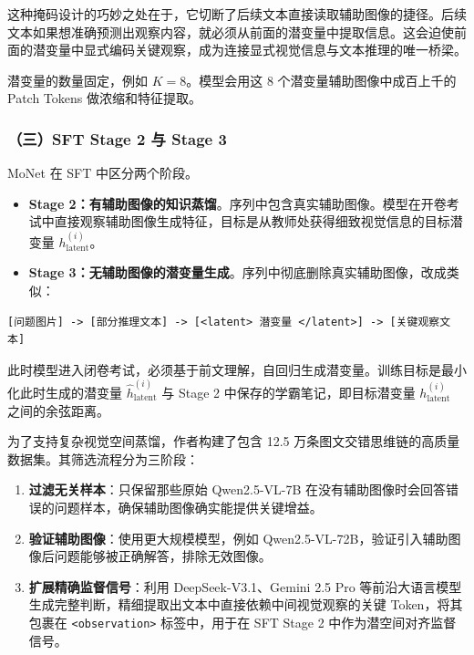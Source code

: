 这种掩码设计的巧妙之处在于，它切断了后续文本直接读取辅助图像的捷径。后续文本如果想准确预测出观察内容，就必须从前面的潜变量中提取信息。这会迫使前面的潜变量中显式编码关键观察，成为连接显式视觉信息与文本推理的唯一桥梁。

潜变量的数量固定，例如 \(K=8\)。模型会用这 8 个潜变量辅助图像中成百上千的 Patch Tokens 做浓缩和特征提取。

\hypertarget{ux4e09sft-stage-2-ux4e0e-stage-3}{%
\subsubsection{（三）SFT Stage 2 与 Stage 3}\label{ux4e09sft-stage-2-ux4e0e-stage-3}}

MoNet 在 SFT 中区分两个阶段。

\begin{itemize}
\tightlist
\item
  \textbf{Stage 2：有辅助图像的知识蒸馏}。序列中包含真实辅助图像。模型在开卷考试中直接观察辅助图像生成特征，目标是从教师处获得细致视觉信息的目标潜变量 \(h_{\text{latent}}^{(i)}\)。
\item
  \textbf{Stage 3：无辅助图像的潜变量生成}。序列中彻底删除真实辅助图像，改成类似：
\end{itemize}

\begin{verbatim}
[问题图片] -> [部分推理文本] -> [<latent> 潜变量 </latent>] -> [关键观察文本]
\end{verbatim}

此时模型进入闭卷考试，必须基于前文理解，自回归生成潜变量。训练目标是最小化此时生成的潜变量 \(\hat h_{\text{latent}}^{(i)}\) 与 Stage 2 中保存的学霸笔记，即目标潜变量 \(h_{\text{latent}}^{(i)}\) 之间的余弦距离。

为了支持复杂视觉空间蒸馏，作者构建了包含 12.5 万条图文交错思维链的高质量数据集。其筛选流程分为三阶段：

\begin{enumerate}
\def\labelenumi{\arabic{enumi}.}
\tightlist
\item
  \textbf{过滤无关样本}：只保留那些原始 Qwen2.5-VL-7B 在没有辅助图像时会回答错误的问题样本，确保辅助图像确实能提供关键增益。
\item
  \textbf{验证辅助图像}：使用更大规模模型，例如 Qwen2.5-VL-72B，验证引入辅助图像后问题能够被正确解答，排除无效图像。
\item
  \textbf{扩展精确监督信号}：利用 DeepSeek-V3.1、Gemini 2.5 Pro 等前沿大语言模型生成完整判断，精细提取出文本中直接依赖中间视觉观察的关键 Token，将其包裹在 \texttt{\textless{}observation\textgreater{}} 标签中，用于在 SFT Stage 2 中作为潜空间对齐监督信号。
\end{enumerate}

